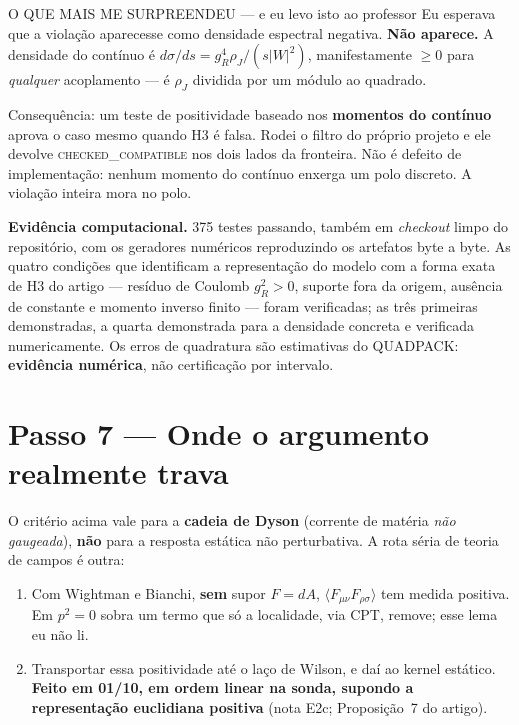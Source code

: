 \documentclass[11pt,a4paper]{article}
\begin{document}
\begin{alerta}{O QUE MAIS ME SURPREENDEU --- e eu levo isto ao professor}
Eu esperava que a viola\c{c}\~ao aparecesse como densidade espectral negativa.
\textbf{N\~ao aparece.} A densidade do cont\'inuo \'e
$d\sigma/ds=g_R^4\rho_J/(s|W|^2)$, manifestamente $\ge0$ para
\emph{qualquer} acoplamento --- \'e $\rho_J$ dividida por um m\'odulo ao quadrado.

Consequ\^encia: um teste de positividade baseado nos \textbf{momentos do
cont\'inuo} aprova o caso mesmo quando H3 \'e falsa. Rodei o filtro do pr\'oprio
projeto e ele devolve \textsc{checked\_compatible} nos dois lados da fronteira.
N\~ao \'e defeito de implementa\c{c}\~ao: nenhum momento do cont\'inuo enxerga um
polo discreto. A viola\c{c}\~ao inteira mora no polo.
\end{alerta}

\textbf{Evid\^encia computacional.} 375 testes passando, tamb\'em em
\emph{checkout} limpo do reposit\'orio, com os geradores num\'ericos
reproduzindo os artefatos byte a byte. As quatro condi\c{c}\~oes que identificam a
representa\c{c}\~ao do modelo com a forma exata de H3 do artigo --- res\'iduo de
Coulomb $g_R^2>0$, suporte fora da origem, aus\^encia de constante e momento
inverso finito --- foram verificadas; as tr\^es primeiras demonstradas, a quarta
demonstrada para a densidade concreta e verificada numericamente.
Os erros de quadratura s\~ao estimativas do QUADPACK: \textbf{evid\^encia
num\'erica}, n\~ao certifica\c{c}\~ao por intervalo.

\section*{Passo 7 --- Onde o argumento realmente trava}

O critério acima vale para a \textbf{cadeia de Dyson} (corrente de matéria
\emph{não gaugeada}), \textbf{não} para a resposta estática não perturbativa.
A rota séria de teoria de campos é outra:

\begin{enumerate}[leftmargin=7mm,itemsep=3pt]
\item Com Wightman e Bianchi, \textbf{sem} supor $F=dA$,
  $\langle F_{\mu\nu}F_{\rho\sigma}\rangle$ tem medida positiva. Em $p^2=0$
  sobra um termo que só a localidade, via CPT, remove; esse lema eu não li.
\item Transportar essa positividade até o laço de Wilson, e daí ao kernel
  estático. \textbf{Feito em 01/10, em ordem linear na sonda, supondo a
  representação euclidiana positiva} (nota E2c; Proposição~7 do artigo).
\end{enumerate}
\end{document}
